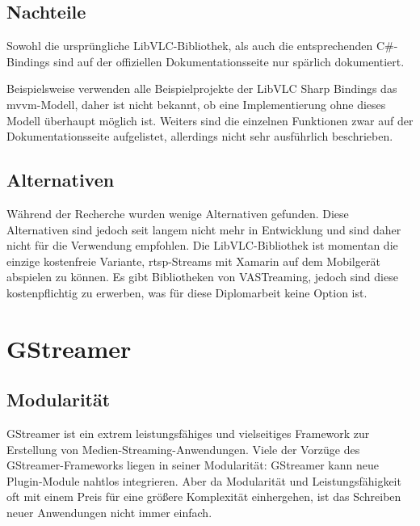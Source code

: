 \subsection{Nachteile}
Sowohl die ursprüngliche LibVLC-Bibliothek, als auch die entsprechenden C\#-Bindings sind auf der offiziellen Dokumentationsseite nur spärlich dokumentiert. \cite[vgl.][]{libvlc-sharp-doc}\par

Beispielsweise verwenden alle Beispielprojekte der LibVLC Sharp Bindings das \ac{mvvm}-Modell, daher ist nicht bekannt, ob eine Implementierung ohne dieses Modell überhaupt möglich ist.
Weiters sind die einzelnen Funktionen zwar auf der Dokumentationsseite aufgelistet, allerdings nicht sehr ausführlich beschrieben. \cite[vgl.][]{libvlc-sharp-doc}

\subsection{Alternativen}
Während der Recherche wurden wenige Alternativen gefunden. Diese Alternativen sind jedoch seit langem nicht mehr in Entwicklung und sind daher nicht für die Verwendung empfohlen. Die LibVLC-Bibliothek ist momentan die einzige kostenfreie Variante, \ac{rtsp}-Streams mit Xamarin auf dem Mobilgerät abspielen zu können. Es gibt Bibliotheken von VASTreaming, jedoch sind diese kostenpflichtig zu erwerben, was für diese Diplomarbeit keine Option ist. \cite[vgl.][Pricing]{vastreaming}

\section{GStreamer}
\subsection{Modularität}
GStreamer ist ein extrem leistungsfähiges und vielseitiges Framework zur Erstellung von Medien-Streaming-Anwendungen.
Viele der Vorzüge des GStreamer-Frameworks liegen in seiner Modularität:
GStreamer kann neue Plugin-Module nahtlos integrieren.
Aber da Modularität und Leistungsfähigkeit oft mit einem Preis für eine größere Komplexität einhergehen, ist das Schreiben neuer Anwendungen nicht immer einfach.
\cite[aus dem Englischen übersetzt]{gstreamer}\par

